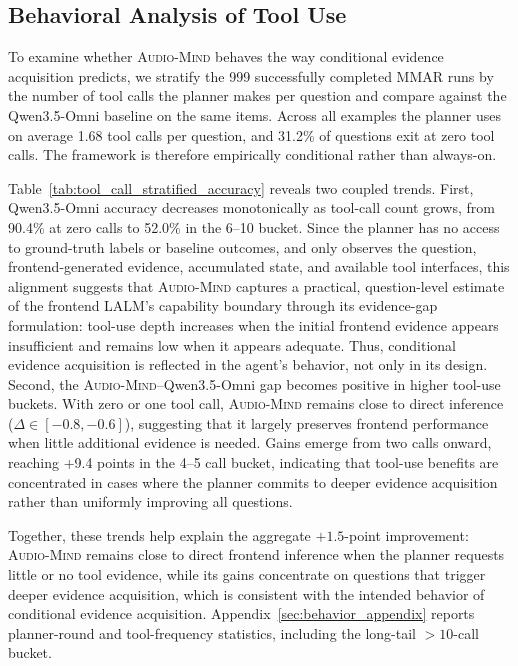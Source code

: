 \documentclass[11pt]{article}
\newcommand{\ours}{\textsc{Audio-Mind}}
\begin{document}
\subsection{Behavioral Analysis of Tool Use}
\label{sec:behavior_analysis}

To examine whether \ours{} behaves the way conditional evidence acquisition predicts, we stratify the 999 successfully completed MMAR runs by the number of tool calls the planner makes per question and compare against the Qwen3.5-Omni baseline on the same items. Across all examples the planner uses on average 1.68 tool calls per question, and 31.2\% of questions exit at zero tool calls. The framework is therefore empirically conditional rather than always-on.

Table~\ref{tab:tool_call_stratified_accuracy} reveals two coupled trends. First, Qwen3.5-Omni accuracy decreases monotonically as tool-call count grows, from 90.4\% at zero calls to 52.0\% in the 6--10 bucket. Since the planner has no access to ground-truth labels or baseline outcomes, and only observes the question, frontend-generated evidence, accumulated state, and available tool interfaces, this alignment suggests that \ours{} captures a practical, question-level estimate of the frontend LALM's capability boundary through its evidence-gap formulation: tool-use depth increases when the initial frontend evidence appears insufficient and remains low when it appears adequate. Thus, conditional evidence acquisition is reflected in the agent's behavior, not only in its design. Second, the \ours{}--Qwen3.5-Omni gap becomes positive in higher tool-use buckets. With zero or one tool call, \ours{} remains close to direct inference ($\Delta \in [-0.8,-0.6]$), suggesting that it largely preserves frontend performance when little additional evidence is needed. Gains emerge from two calls onward, reaching +9.4 points in the 4--5 call bucket, indicating that tool-use benefits are concentrated in cases where the planner commits to deeper evidence acquisition rather than uniformly improving all questions.

Together, these trends help explain the aggregate $+1.5$-point improvement: \ours{} remains close to direct frontend inference when the planner requests little or no tool evidence, while its gains concentrate on questions that trigger deeper evidence acquisition, which is consistent with the intended behavior of conditional evidence acquisition. Appendix~\ref{sec:behavior_appendix} reports planner-round and tool-frequency statistics, including the long-tail $>10$-call bucket.
\end{document}
